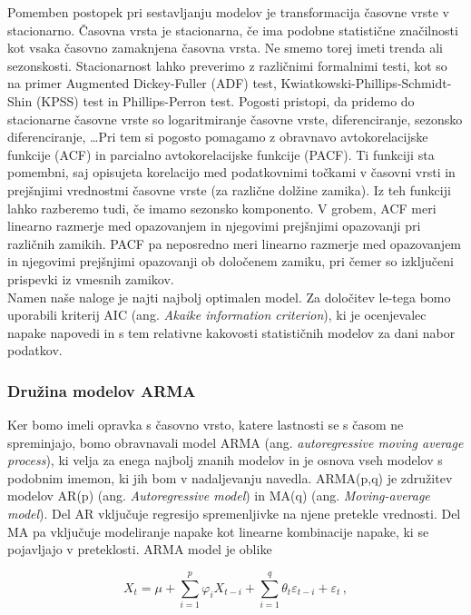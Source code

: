 \documentclass[a4paper, 11pt]{article}
\begin{document}
\noindent Pomemben postopek pri sestavljanju modelov je transformacija časovne vrste v stacionarno.
Časovna vrsta je stacionarna, če ima podobne statistične značilnosti kot vsaka časovno zamaknjena časovna vrsta. 
Ne smemo torej imeti trenda ali sezonskosti.
Stacionarnost lahko preverimo z različnimi formalnimi testi, kot so na primer Augmented Dickey-Fuller (ADF) test,
Kwiatkowski-Phillips-Schmidt-Shin (KPSS) test in Phillips-Perron test.
Pogosti pristopi, da pridemo do stacionarne časovne vrste so logaritmiranje časovne vrste, diferenciranje,
sezonsko diferenciranje, \dots Pri tem si pogosto pomagamo z obravnavo 
avtokorelacijske funkcije (ACF) in parcialno avtokorelacijske funkcije (PACF). 
Ti funkciji sta pomembni, saj opisujeta korelacijo med podatkovnimi točkami v časovni vrsti in prejšnjimi vrednostmi 
časovne vrste (za različne dolžine zamika). Iz teh funkciji lahko razberemo tudi, če imamo sezonsko komponento.
V grobem, ACF meri linearno razmerje med opazovanjem in njegovimi prejšnjimi opazovanji pri različnih zamikih. 
PACF pa neposredno meri linearno razmerje med opazovanjem in njegovimi prejšnjimi opazovanji ob določenem zamiku, 
pri čemer so izključeni prispevki iz vmesnih zamikov. \cite{Stacionarity_V,Brilej_2021} \\

\noindent Namen naše naloge je najti najbolj optimalen model. Za določitev le-tega bomo uporabili kriterij AIC (ang. \emph{Akaike information criterion}),
ki je ocenjevalec napake napovedi in s tem relativne kakovosti statističnih modelov za dani nabor podatkov.

\subsubsection{Družina modelov ARMA}

\noindent Ker bomo imeli opravka s časovno vrsto, katere lastnosti se s časom ne spreminjajo, bomo
obravnavali model ARMA (ang. \emph{autoregressive moving average process}), ki velja za enega najbolj znanih modelov 
in je osnova vseh modelov s podobnim imemon, ki jih bom v nadaljevanju navedla. 
ARMA(p,q) je združitev modelov AR(p) (ang. \emph{Autoregressive model}) in MA(q) (ang. \emph{Moving-average model}). 
Del AR vključuje regresijo spremenljivke na njene pretekle vrednosti. 
Del MA pa vključuje modeliranje napake kot linearne kombinacije napake, ki se pojavljajo v preteklosti.
ARMA model je oblike

\begin{equation}
    \label{ARIMA}
    X_t = \mu +  \sum_{i=1}^{p}{\varphi_i X_{t-i}} + \sum_{i=1}^{q}{\theta_t \varepsilon_{t-i}} + \varepsilon_t \,,
\end{equation}
\end{document}
